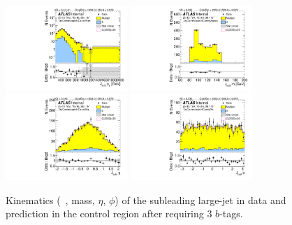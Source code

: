 \begin{figure}[htb!]
\begin{center}
\includegraphics[width=0.41\textwidth,angle=-90]{figures/boosted/Control/b77_ThreeTag_Control_sublHCand_Pt_m_1.pdf}
\includegraphics[width=0.41\textwidth,angle=-90]{figures/boosted/Control/b77_ThreeTag_Control_sublHCand_Mass_s.pdf}\\
\includegraphics[width=0.41\textwidth,angle=-90]{figures/boosted/Control/b77_ThreeTag_Control_sublHCand_Eta.pdf}
\includegraphics[width=0.41\textwidth,angle=-90]{figures/boosted/Control/b77_ThreeTag_Control_sublHCand_Phi.pdf}
  \caption{Kinematics (\pt~, mass, $\eta$, $\phi$) of the subleading large-\R jet in data and prediction in the control region after requiring 3 $b$-tags. }
  \label{fig:boosted-3b-control-ak10-subl}
\end{center}
\end{figure}

